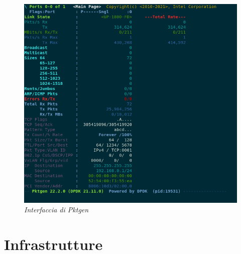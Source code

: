 \FloatBarrier
\begin{figure}[h]
\includegraphics[scale=0.4]{images/pktgen_1.png}
\centering
\caption{\textit{Interfaccia di Pktgen}}
\vspace{1cm}
\label{fig:pktgen_1}
\end{figure}
\FloatBarrier


\section*{Infrastrutture}

